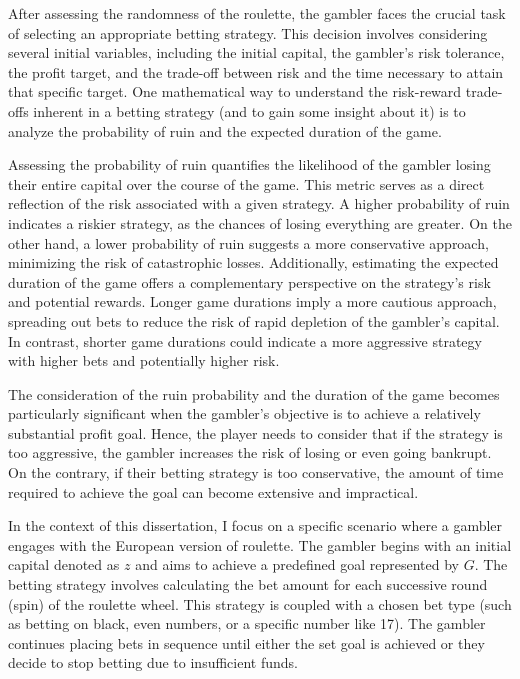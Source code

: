 \documentclass[11pt,twoside]{article}
\numberwithin{Theorem}{section}
\numberwithin{Definition}{section}
\numberwithin{Lemma}{section}
\numberwithin{Algorithm}{section}
\numberwithin{equation}{section}
\begin{document}
After assessing the randomness of the roulette, the gambler faces the crucial task of selecting an appropriate betting strategy. This decision involves considering several initial variables, including the initial capital, the gambler's risk tolerance, the profit target, and the trade-off between risk and the time necessary to attain that specific target. One mathematical way to understand the risk-reward trade-offs inherent in a betting strategy (and to gain some insight about it) is to analyze the probability of ruin and the expected duration of the game. 

Assessing the probability of ruin quantifies the likelihood of the gambler losing their entire capital over the course of the game. This metric serves as a direct reflection of the risk associated with a given strategy. A higher probability of ruin indicates a riskier strategy, as the chances of losing everything are greater. On the other hand, a lower probability of ruin suggests a more conservative approach, minimizing the risk of catastrophic losses. Additionally, estimating the expected duration of the game offers a complementary perspective on the strategy's risk and potential rewards. Longer game durations imply a more cautious approach, spreading out bets to reduce the risk of rapid depletion of the gambler's capital. In contrast, shorter game durations could indicate a more aggressive strategy with higher bets and potentially higher risk.

The consideration of the ruin probability and the duration of the game becomes particularly significant when the gambler's objective is to achieve a relatively substantial profit goal. Hence, the player needs to consider that if the strategy is too aggressive, the gambler increases the risk of losing or even going bankrupt. On the contrary, if their betting strategy is too conservative, the amount of time required to achieve the goal can become extensive and impractical.

In the context of this dissertation, I focus on a specific scenario where a gambler engages with the European version of roulette. The gambler begins with an initial capital denoted as $z$ and aims to achieve a predefined goal represented by $G$. The betting strategy involves calculating the bet amount for each successive round (spin) of the roulette wheel. This strategy is coupled with a chosen bet type (such as betting on black, even numbers, or a specific number like 17). The gambler continues placing bets in sequence until either the set goal is achieved or they decide to stop betting due to insufficient funds.
\end{document}

